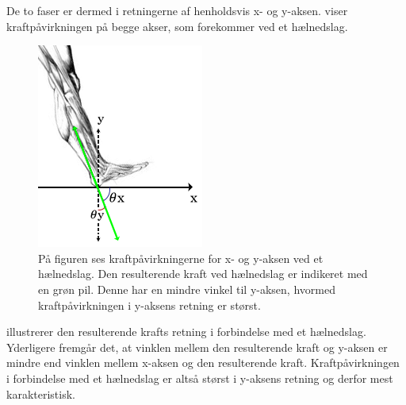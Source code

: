 De to faser er dermed i retningerne af henholdsvis x- og y-aksen.  viser kraftpåvirkningen på begge akser, som forekommer ved et hælnedslag.  
\begin{figure}[H]
	\centering
	\includegraphics[scale=0.55]{figures/bProblemloesning/kraefter_akser.png}
	\caption{På figuren ses kraftpåvirkningerne for x- og y-aksen ved et hælnedslag. Den resulterende kraft ved hælnedslag er indikeret med en grøn pil. Denne har en mindre vinkel til y-aksen, hvormed kraftpåvirkningen i y-aksens retning er størst.}
	\label{fig:kraefter_akser}
\end{figure}\vspace{-0.25cm} 
 illustrerer den resulterende krafts retning i forbindelse med et hælnedslag. Yderligere fremgår det, at vinklen mellem den resulterende kraft og y-aksen er mindre end vinklen mellem x-aksen og den resulterende kraft. Kraftpåvirkningen i forbindelse med et hælnedslag er altså størst i y-aksens retning og derfor mest karakteristisk.~\citep{Rueterbories2010,Serway2010,ClelandKikhia2013}

